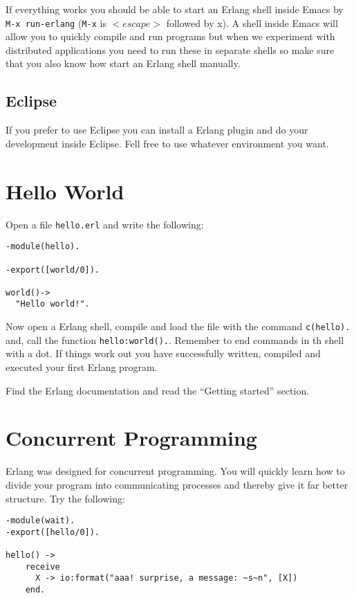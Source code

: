 \documentclass[a4paper, 11pt]{article}
\begin{document}
If everything works you should be able to start an Erlang shell inside
Emacs by {\tt M-x run-erlang} ({\tt M-x} is $<escape>$ followed by
x). A shell inside Emacs will allow you to quickly compile and run
programs but when we experiment with distributed applications you need
to run these in separate shells so make sure that you also know how
start an Erlang shell manually.

\subsection{Eclipse}

If you prefer to use Eclipse you can install a Erlang plugin and do
your development inside Eclipse. Fell free to use whatever
environment you want.

\section{Hello World}

Open a file {\tt hello.erl} and write the following:

\begin{verbatim}
-module(hello).

-export([world/0]).

world()->
  "Hello world!".
\end{verbatim}

\noindent Now open a Erlang shell,  compile and load the file with the command
{\tt c(hello).} and, call the function {\tt hello:world().}.  Remember
to end commands in th shell with a dot. If things work out you have
successfully written, compiled and executed your first Erlang program.

Find the Erlang documentation and read the ``Getting started''
section. 

\section{Concurrent Programming}

Erlang was designed for concurrent programming. You will quickly learn
how to divide your program into communicating processes and thereby
give it far better structure. Try the following:

\begin{verbatim}
-module(wait).
-export([hello/0]).

hello() ->
    receive
      X -> io:format("aaa! surprise, a message: ~s~n", [X])
    end.
\end{verbatim}
\end{document}

